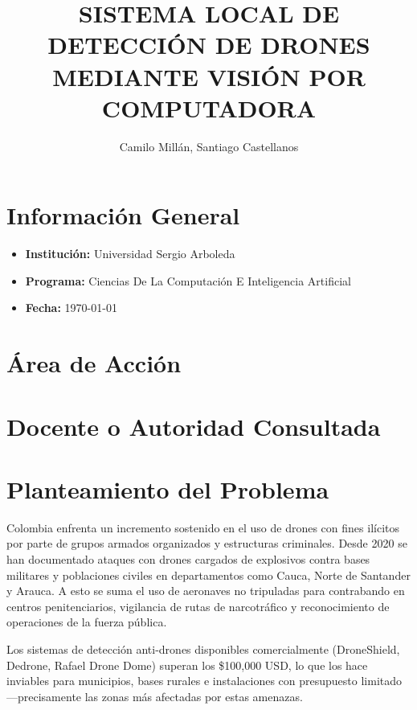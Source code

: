 \documentclass[sigconf,nonacm]{acmart}
\title{SISTEMA LOCAL DE DETECCIÓN DE DRONES MEDIANTE VISIÓN POR COMPUTADORA}
\author{Camilo Millán, Santiago Castellanos}
\affiliation{%
\institution{Universidad Sergio Arboleda}
\city{Bogotá}
\country{Colombia}
}
\begin{document}
\maketitle


\section{Información General}


\begin{itemize}
\item \textbf{Institución:} Universidad Sergio Arboleda
\item \textbf{Programa:} Ciencias De La Computación E Inteligencia Artificial
\item \textbf{Fecha:} \today
\end{itemize}


\section{Área de Acción}


\cajainfo{\getareaaccion}


\section{Docente o Autoridad Consultada}


\cajainfo{\getautoridadconsultada}


\section{Planteamiento del Problema}


Colombia enfrenta un incremento sostenido en el uso de drones con fines ilícitos por parte de grupos armados organizados y estructuras criminales. Desde 2020 se han documentado ataques con drones cargados de explosivos contra bases militares y poblaciones civiles en departamentos como Cauca, Norte de Santander y Arauca. A esto se suma el uso de aeronaves no tripuladas para contrabando en centros penitenciarios, vigilancia de rutas de narcotráfico y reconocimiento de operaciones de la fuerza pública.

Los sistemas de detección anti-drones disponibles comercialmente (DroneShield, Dedrone, Rafael Drone Dome) superan los \$100,000 USD, lo que los hace inviables para municipios, bases rurales e instalaciones con presupuesto limitado ---precisamente las zonas más afectadas por estas amenazas.
\end{document}
